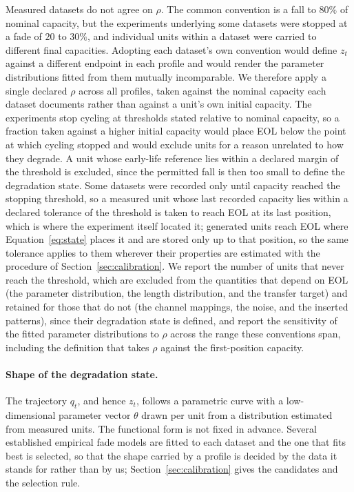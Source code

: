 \documentclass{article}
\newif\ifreview \reviewtrue        %
\newcommand{\rev}[1]{\ifreview\textcolor[HTML]{0B5FA5}{#1}\else#1\fi}
\newcommand{\revwhy}[1]{\ifreview\marginpar{\footnotesize\raggedright\textcolor[HTML]{0B5FA5}{#1}}\fi}
\newcommand{\revw}[1]{\ifreview\textcolor[HTML]{6FA8A0}{#1}\else#1\fi}   %
\begin{document}
Measured datasets do not agree on $\rho$. The common convention is a fall to $80\%$ of nominal capacity, but the experiments underlying some datasets were stopped at a fade of $20$ to $30\%$, and individual units within a dataset were carried to different final capacities. Adopting each dataset's own convention would define $z_t$ against a different endpoint in each profile and would render the parameter distributions fitted from them mutually incomparable. We therefore apply a single declared $\rho$ across all profiles\rev{, taken against the nominal capacity each dataset documents rather than against a unit's own initial capacity. The experiments stop cycling at thresholds stated relative to nominal capacity, so a fraction taken against a higher initial capacity would place EOL below the point at which cycling stopped and would exclude units for a reason unrelated to how they degrade. A unit whose early-life reference lies within a declared margin of the threshold is excluded, since the permitted fall is then too small to define the degradation state.} \rev{Some datasets were recorded only until capacity reached the stopping threshold, so a measured unit whose last recorded capacity lies within a declared tolerance of the threshold is taken to reach EOL at its last position, which is where the experiment itself located it; generated units reach EOL where Equation~\ref{eq:state} places it and are stored only up to that position, so the same tolerance applies to them wherever their properties are estimated with the procedure of Section~\ref{sec:calibration}.}\revwhy{D13: records cut at the stopping rule; D30: generated series also end at EOL} \revw{We} report the number of units that never reach \rev{the threshold}, which are excluded \rev{from the quantities that depend on EOL (the parameter distribution, the length distribution, and the transfer target) and retained for those that do not (the channel mappings, the noise, and the inserted patterns), since their degradation state is defined}, and report the sensitivity of the fitted parameter distributions to $\rho$ across the range these conventions span\rev{, including the definition that takes $\rho$ against the first-position capacity}.
 
\paragraph{Shape of the degradation state.}
The trajectory $q_t$, and hence $z_t$, follows a parametric curve with a low-dimensional parameter vector $\theta$ drawn per unit from a distribution estimated from measured units. The functional form is not fixed in advance. Several established empirical fade models are fitted to each dataset and the one that fits best is selected, so that the shape carried by a profile is decided by the data it stands for rather than by us; Section~\ref{sec:calibration} gives the candidates and the selection rule.
 
\end{document}
